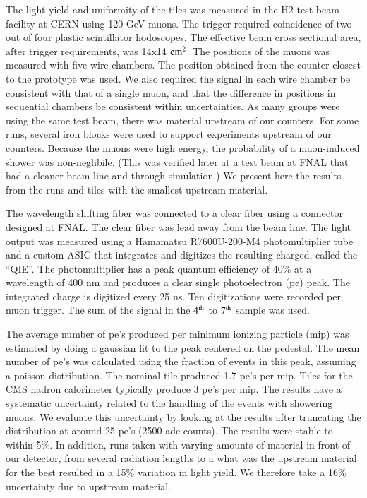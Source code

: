 \documentclass[review]{elsarticle}
\begin{document}
The light yield and uniformity of the tiles was measured in the H2 test beam facility at CERN using 120 GeV muons.  The trigger required coincidence of two out of four plastic scintillator hodoscopes. The effective beam cross sectional area, after trigger requirements, was 14x14 ${\rm cm^2}$. The positions of the muons was measured with five wire chambers. The position obtained from the counter closest to the
prototype was used.  We also required the signal in each wire chamber be consistent with that of a single muon, and that the difference in positions in sequential chambers be consistent within uncertainties.
As many groups were using the same test beam, there was material upstream of our counters.  For some runs, several iron blocks were used to support experiments upstream of our counters.  Because the muons were high energy, the probability of a muon-induced shower was non-neglibile.  (This was verified later at a test beam at FNAL that had a cleaner beam line and through simulation.)  We present here the results
from the runs and tiles with the smallest upstream material.


The wavelength shifting fiber was connected to a clear fiber using a connector designed at FNAL.  The clear fiber was lead away from the beam line.
The light output was measured using a Hamamatsu R7600U-200-M4 photomultiplier tube and a custom ASIC that integrates and digitizes the resulting charged, called the ``QIE''\cite{qie}.  The photomultiplier has a peak quantum efficiency of 40\% at a wavelength of 400 nm and produces a clear single photoelectron (pe) peak.
The integrated charge is digitized every 25 ns.  Ten digitizations were recorded per muon trigger.  The sum of the signal in the ${\rm 4^{th}}$ to ${\rm 7^{th}}$ sample was used.


The average number of pe's produced per minimum ionizing particle (mip) was estimated by doing a gaussian fit to the peak centered on the pedestal.  The mean number of pe's was calculated using the fraction of events in this peak, assuming a poisson distribution.  The nominal tile produced 1.7 pe's per mip.
Tiles for the CMS hadron calorimeter typically produce 3 pe's per mip\cite{CMSHB}.
The results have a systematic uncertainty related to the handling of the events with showering muons.  We evaluate this uncertainty by looking at the results after truncating the distribution at around 25 pe's (2500 adc counts).  The results were stable to within 5\%.  In addition, runs taken with varying amounts of material in front of our detector, from several radiation lengths to a {\color{red} what was the upstream material for the best} resulted in a 15\% variation in light yield.  We therefore take a 16\% uncertainty due to upstream material.
\end{document}
